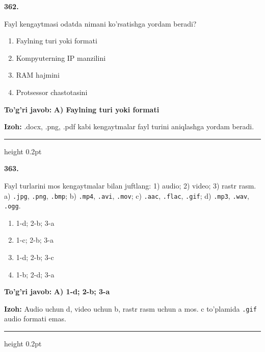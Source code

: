 \documentclass[10pt,a4paper]{article}
\begin{document}
{\bfseries\sffamily\color{ink} 362.}
\par
Fayl kengaytmasi odatda nimani ko'rsatishga yordam beradi?
\begin{enumerate}[label=\Alph*),leftmargin=9mm]
\item Faylning turi yoki formati
\item Kompyuterning IP manzilini
\item RAM hajmini
\item Protsessor chastotasini
\end{enumerate}
\begin{tcolorbox}[enhanced,breakable,colback=teal!4,colframe=teal!60!black,boxrule=0.45pt,arc=1.2mm,left=2.7mm,right=2.7mm,top=1.8mm,bottom=1.8mm,before skip=2mm,after skip=2mm]
{\bfseries\sffamily\color{teal}To'g'ri javob:} \textbf{A) Faylning turi yoki formati}
\par\smallskip
{\bfseries Izoh:} .docx, .png, .pdf kabi kengaytmalar fayl turini aniqlashga yordam beradi.
\end{tcolorbox}
\vspace{2mm}\hrule height 0.2pt\vspace{3mm}

{\bfseries\sffamily\color{ink} 363.}
\par
Fayl turlarini mos kengaytmalar bilan juftlang: 1) audio; 2) video; 3) rastr rasm. a) \texttt{.jpg}, \texttt{.png}, \texttt{.bmp}; b) \texttt{.mp4}, \texttt{.avi}, \texttt{.mov}; c) \texttt{.aac}, \texttt{.flac}, \texttt{.gif}; d) \texttt{.mp3}, \texttt{.wav}, \texttt{.ogg}.
\begin{enumerate}[label=\Alph*),leftmargin=9mm]
\item 1-d; 2-b; 3-a
\item 1-c; 2-b; 3-a
\item 1-d; 2-b; 3-c
\item 1-b; 2-d; 3-a
\end{enumerate}
\begin{tcolorbox}[enhanced,breakable,colback=teal!4,colframe=teal!60!black,boxrule=0.45pt,arc=1.2mm,left=2.7mm,right=2.7mm,top=1.8mm,bottom=1.8mm,before skip=2mm,after skip=2mm]
{\bfseries\sffamily\color{teal}To'g'ri javob:} \textbf{A) 1-d; 2-b; 3-a}
\par\smallskip
{\bfseries Izoh:} Audio uchun d, video uchun b, rastr rasm uchun a mos. c to'plamida \texttt{.gif} audio formati emas.
\end{tcolorbox}
\vspace{2mm}\hrule height 0.2pt\vspace{3mm}
\end{document}
